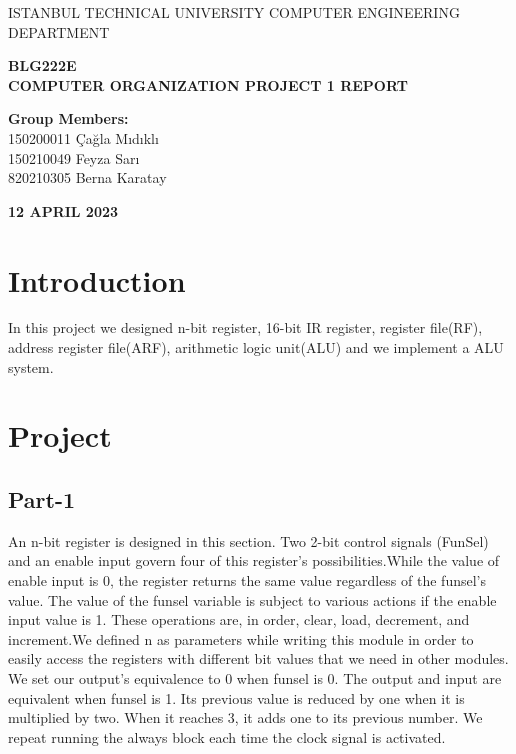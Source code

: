 \documentclass[12pt]{article}
\begin{document}
\begin{titlepage}
  \begin{center}
  
\vspace*{0.5cm} 
  \Large{ISTANBUL TECHNICAL UNIVERSITY
COMPUTER ENGINEERING DEPARTMENT}

\vspace{2cm}
  \huge{\textbf{BLG222E}}\\
  \huge{\textbf{COMPUTER ORGANIZATION PROJECT 1 REPORT}}

\vspace{3cm}
  \Large{\textbf{Group Members:}}\\
  150200011 Çağla Mıdıklı\\
  150210049 Feyza Sarı\\
  820210305 Berna Karatay 
  
\vfill
  \Large{\textbf{12 APRIL 2023}}  
  
  \end{center}

  \end{titlepage}

\tableofcontents
\thispagestyle{empty}  
\clearpage
\setcounter{page}{1}

\section{Introduction}
In this project we designed n-bit register, 16-bit IR register, register file(RF), address register file(ARF), arithmetic logic unit(ALU) and we implement a ALU system.


\section{Project}


\subsection{Part-1}
An n-bit register is designed in this section. Two 2-bit control signals (FunSel) and an enable input govern four of this register's possibilities.While the value of enable input is 0,  the register returns the same value regardless of the funsel's value. The value of the funsel variable is subject to various actions if the enable input value is 1. These operations are, in order, clear, load, decrement, and increment.We defined n as parameters while writing this module in order to easily access the registers with different bit values that we need in other modules. We set our output's equivalence to 0 when funsel is 0. The output and input are equivalent when funsel is 1. Its previous value is reduced by one when it is multiplied by two. When it reaches 3, it adds one to its previous number. We repeat running the always block each time the clock signal is activated.
\end{document}
